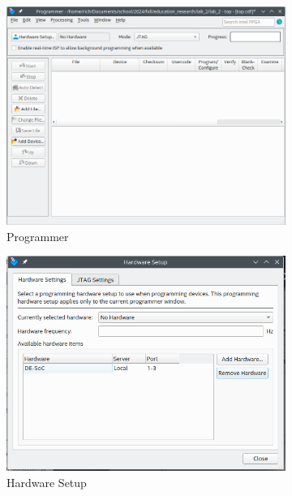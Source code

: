 \documentclass[12pt]{betterjournal}
\begin{document}
\begin{figure}[htbp!]
    \centering
    \begin{subfigure}{0.45\textwidth}    
    \includegraphics[width=1\linewidth]{programmer.png}
    \caption{Programmer}
    \label{fig:programmer}
    \end{subfigure}
    \hfill
    \begin{subfigure}{0.45\textwidth}
        \includegraphics[width=1\linewidth]{hardwaresetup.png}
        \caption{Hardware Setup}
        \label{fig:hardwaresetup}
    \end{subfigure}
    \caption{}
\end{figure}
\end{document}
